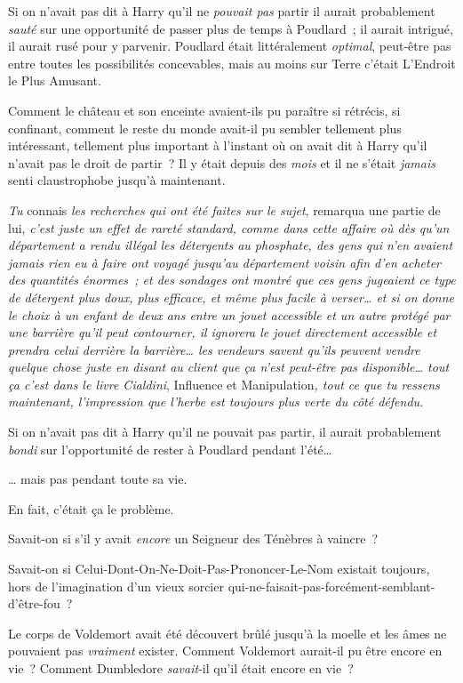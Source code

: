 Si on n'avait pas dit à Harry qu'il ne \emph{pouvait pas} partir il aurait probablement \emph{sauté} sur une opportunité de passer plus de temps à Poudlard~; il aurait intrigué, il aurait rusé pour y parvenir. Poudlard était littéralement \emph{optimal}, peut-être pas entre toutes les possibilités concevables, mais au moins sur Terre c'était L'Endroit le Plus Amusant.

Comment le château et son enceinte avaient-ils pu paraître si rétrécis, si confinant, comment le reste du monde avait-il pu sembler tellement plus intéressant, tellement plus important à l'instant où on avait dit à Harry qu'il n'avait pas le droit de partir~? Il y était depuis des \emph{mois} et il ne s'était \emph{jamais} senti claustrophobe jusqu'à maintenant.

\emph{Tu} connais \emph{les recherches qui ont été faites sur le sujet}, remarqua une partie de lui, \emph{c'est juste un effet de rareté standard, comme dans cette affaire où dès qu'un département a rendu illégal les détergents au phosphate, des gens qui n'en avaient jamais rien eu à faire ont voyagé jusqu'au département voisin afin d'en acheter des quantités énormes~; et des sondages ont montré que ces gens jugeaient ce type de détergent plus doux, plus efficace, et même plus facile à verser… et si on donne le choix à un enfant de deux ans entre un jouet accessible et un autre protégé par une barrière qu'il peut contourner, il ignorera le jouet directement accessible et prendra celui derrière la barrière… les vendeurs savent qu'ils peuvent vendre quelque chose juste en disant au client que ça n'est peut-être pas disponible… tout ça c'est dans le livre Cialdini}, Influence et Manipulation\emph{, tout ce que tu ressens maintenant, l'impression que l'herbe est toujours plus verte du côté défendu.}

Si on n'avait pas dit à Harry qu'il ne pouvait pas partir, il aurait probablement \emph{bondi} sur l'opportunité de rester à Poudlard pendant l'été…

… mais pas pendant toute sa vie.

En fait, c'était ça le problème.

Savait-on si s'il y avait \emph{encore} un Seigneur des Ténèbres à vaincre~?

Savait-on si Celui-Dont-On-Ne-Doit-Pas-Prononcer-Le-Nom existait toujours, hors de l'imagination d'un vieux sorcier qui-ne-faisait-pas-forcément-semblant-d'être-fou~?

Le corps de Voldemort avait été découvert brûlé jusqu'à la moelle et les âmes ne pouvaient pas \emph{vraiment} exister. Comment Voldemort aurait-il pu être encore en vie~? Comment Dumbledore \emph{savait}-il qu'il était encore en vie~?

